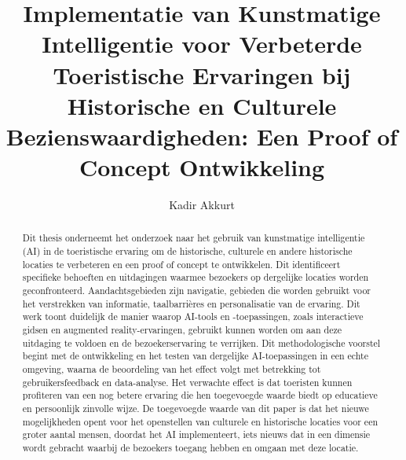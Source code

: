\documentclass{hogent-article}
\title{Implementatie van Kunstmatige Intelligentie voor Verbeterde Toeristische Ervaringen bij Historische en Culturele Bezienswaardigheden: Een Proof of Concept Ontwikkeling}
\author{Kadir Akkurt}
\begin{document}
\begin{abstract}
  
  Dit thesis onderneemt het onderzoek naar het gebruik van kunstmatige intelligentie (AI) in de toeristische ervaring om de historische, culturele en andere historische locaties te verbeteren en een proof of concept te ontwikkelen. Dit identificeert specifieke behoeften en uitdagingen waarmee bezoekers op dergelijke locaties worden geconfronteerd. Aandachtsgebieden zijn navigatie, gebieden die worden gebruikt voor het verstrekken van informatie, taalbarrières en personalisatie van de ervaring. Dit werk toont duidelijk de manier waarop AI-tools en -toepassingen, zoals interactieve gidsen en augmented reality-ervaringen, gebruikt kunnen worden om aan deze uitdaging te voldoen en de bezoekerservaring te verrijken. Dit methodologische voorstel begint met de ontwikkeling en het testen van dergelijke AI-toepassingen in een echte omgeving, waarna de beoordeling van het effect volgt met betrekking tot gebruikersfeedback en data-analyse. Het verwachte effect is dat toeristen kunnen profiteren van een nog betere ervaring die hen toegevoegde waarde biedt op educatieve en persoonlijk zinvolle wijze. De toegevoegde waarde van dit paper is dat het nieuwe mogelijkheden opent voor het openstellen van culturele en historische locaties voor een groter aantal mensen, doordat het AI implementeert, iets nieuws dat in een dimensie wordt gebracht waarbij de bezoekers toegang hebben en omgaan met deze locatie.
\end{abstract}

\tableofcontents



\setlength\bibitemsep{2pt} %
\printbibliography[heading=bibintoc]
\end{document}
